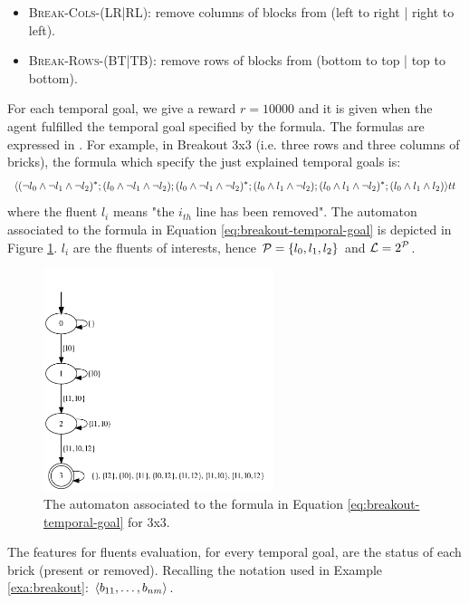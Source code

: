 \begin{itemize}
	\item \textsc{Break-Cols-(LR|RL)}:  remove columns of blocks from (left to right | right to left).
	\item \textsc{Break-Rows-(BT|TB)}:  remove rows of blocks from (bottom to top | top to bottom).
\end{itemize}

For each temporal goal, we give a reward $r = 10000$ and it is given when the agent fulfilled the temporal goal specified by the formula.
The formulas are expressed in \LDLf. For example, in Breakout 3x3 (i.e. three rows and three columns of bricks), the formula which specify the just explained temporal goals is:
\begin{equation}\label{eq:breakout-temporal-goal}
\langle (\lnot l_0 \wedge \lnot l_1 \wedge \lnot l_2)^*;(l_0 \wedge \lnot l_1 \wedge \lnot l_2);(l_0 \wedge \lnot l_1 \wedge \lnot l_2)^*;(l_0 \wedge l_1 \wedge \lnot l_2);(l_0 \wedge l_1 \wedge \lnot l_2)^*;(l_0 \wedge l_1 \wedge l_2) \rangle tt
\end{equation}
where the fluent $l_i$ means "the $i_{th}$ line has been removed".
The automaton associated to the formula in Equation \ref{eq:breakout-temporal-goal} is depicted in Figure \ref{fig:breakout-automaton}. $l_i$ are the fluents of interests, hence $\mathcal{P} = \{l_0, l_1, l_2\}$ and $\mathcal{L} = 2^{\mathcal{P}}$.

\begin{figure}[h]
	\centering
	\includegraphics[width=0.6\textwidth]{images/breakout.png}
 	\caption{The automaton associated to the \LDLf formula in Equation \ref{eq:breakout-temporal-goal} for \Breakout 3x3.}
 	\label{fig:breakout-automaton}
\end{figure}

The features for fluents evaluation, for every temporal goal, are the status of each brick (present or removed). Recalling the notation used in Example \ref{exa:breakout}: $\langle b_{11}, \dots, b_{nm} \rangle$.

